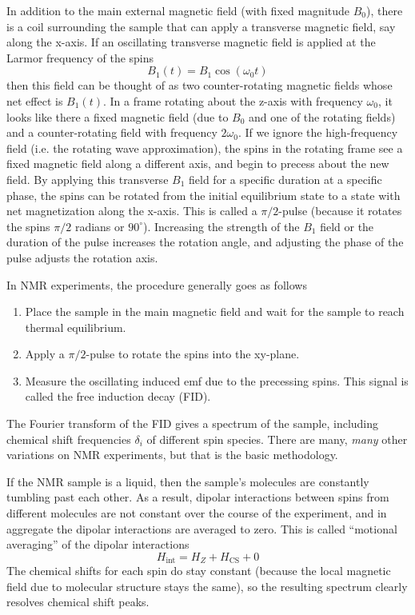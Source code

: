 In addition to the main external magnetic field (with fixed magnitude $B_0$), there is a coil surrounding the sample that can apply a transverse magnetic field, say along the x-axis. If an oscillating transverse magnetic field is applied at the Larmor frequency of the spins
\[
B_1(t) = B_1 \cos(\omega_0 t)
\]
then this field can be thought of as two counter-rotating magnetic fields whose net effect is $B_1(t)$. In a frame rotating about the z-axis with frequency $\omega_0$, it looks like there a fixed magnetic field (due to $B_0$ and one of the rotating fields) and a counter-rotating field with frequency $2\omega_0$. If we ignore the high-frequency field (i.e. the rotating wave approximation), the spins in the rotating frame see a fixed magnetic field along a different axis, and begin to precess about the new field. By applying this transverse $B_1$ field for a specific duration at a specific phase,
the spins can be rotated from the initial equilibrium state to a state with net magnetization along the x-axis. This is called a $\pi/2$-pulse (because it rotates the spins $\pi/2$ radians or $90^\circ$). Increasing the strength of the $B_1$ field or the duration of the pulse increases the rotation angle, and adjusting the phase of the pulse adjusts the rotation axis.

In NMR experiments, the procedure generally goes as follows
\begin{enumerate}
    \item Place the sample in the main magnetic field and wait for the sample to reach thermal equilibrium.
    \item Apply a $\pi/2$-pulse to rotate the spins into the xy-plane.
    \item Measure the oscillating induced emf due to the precessing spins. This signal is called the free induction decay (FID).
\end{enumerate}
The Fourier transform of the FID gives a spectrum of the sample, including chemical shift frequencies $\delta_i$ of different spin species. There are many, \emph{many} other variations on NMR experiments, but that is the basic methodology.



If the NMR sample is a liquid, then the sample's molecules are constantly tumbling past each other. As a result, dipolar interactions between spins from different molecules are not constant over the course of the experiment, and in aggregate the dipolar interactions are averaged to zero. This is called ``motional averaging'' of the dipolar interactions
\[
H_{\text{int}} = H_Z + H_\text{CS} + 0
\]
The chemical shifts for each spin do stay constant (because the local magnetic field due to molecular structure stays the same), so the resulting spectrum clearly resolves chemical shift peaks.

